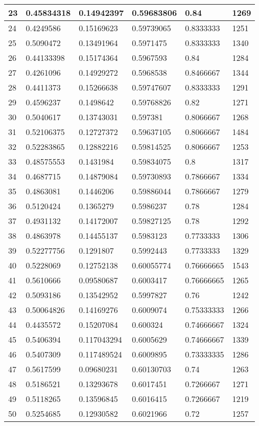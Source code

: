 \begin{longtable}{|l|l|l|l|l|l|}
23 & 0.45834318 & 0.14942397 & 0.59683806 & 0.84 & 1269 \\ \hline 
24 & 0.4249586 & 0.15169623 & 0.59739065 & 0.8333333 & 1251 \\ \hline 
25 & 0.5090472 & 0.13491964 & 0.5971475 & 0.8333333 & 1340 \\ \hline 
26 & 0.44133398 & 0.15174364 & 0.5967593 & 0.84 & 1284 \\ \hline 
27 & 0.4261096 & 0.14929272 & 0.5968538 & 0.8466667 & 1344 \\ \hline 
28 & 0.4411373 & 0.15266638 & 0.59747607 & 0.8333333 & 1291 \\ \hline 
29 & 0.4596237 & 0.1498642 & 0.59768826 & 0.82 & 1271 \\ \hline 
30 & 0.5040617 & 0.13743031 & 0.597381 & 0.8066667 & 1268 \\ \hline 
31 & 0.52106375 & 0.12727372 & 0.59637105 & 0.8066667 & 1484 \\ \hline 
32 & 0.52283865 & 0.12882216 & 0.59814525 & 0.8066667 & 1253 \\ \hline 
33 & 0.48575553 & 0.1431984 & 0.59834075 & 0.8 & 1317 \\ \hline 
34 & 0.4687715 & 0.14879084 & 0.59730893 & 0.7866667 & 1334 \\ \hline 
35 & 0.4863081 & 0.1446206 & 0.59886044 & 0.7866667 & 1279 \\ \hline 
36 & 0.5120424 & 0.1365279 & 0.5986237 & 0.78 & 1284 \\ \hline 
37 & 0.4931132 & 0.14172007 & 0.59827125 & 0.78 & 1292 \\ \hline 
38 & 0.4863978 & 0.14455137 & 0.5983123 & 0.7733333 & 1306 \\ \hline 
39 & 0.52277756 & 0.1291807 & 0.5992443 & 0.7733333 & 1329 \\ \hline 
40 & 0.5228069 & 0.12752138 & 0.60055774 & 0.76666665 & 1543 \\ \hline 
41 & 0.5610666 & 0.09580687 & 0.6003417 & 0.76666665 & 1265 \\ \hline 
42 & 0.5093186 & 0.13542952 & 0.5997827 & 0.76 & 1242 \\ \hline 
43 & 0.50064826 & 0.14169276 & 0.6009074 & 0.75333333 & 1266 \\ \hline 
44 & 0.4435572 & 0.15207084 & 0.600324 & 0.74666667 & 1324 \\ \hline 
45 & 0.5406394 & 0.117043294 & 0.6005629 & 0.74666667 & 1339 \\ \hline 
46 & 0.5407309 & 0.117489524 & 0.6009895 & 0.73333335 & 1286 \\ \hline 
47 & 0.5617599 & 0.09680231 & 0.60130703 & 0.74 & 1263 \\ \hline 
48 & 0.5186521 & 0.13293678 & 0.6017451 & 0.7266667 & 1271 \\ \hline 
49 & 0.5118265 & 0.13596845 & 0.6016415 & 0.7266667 & 1219 \\ \hline 
50 & 0.5254685 & 0.12930582 & 0.6021966 & 0.72 & 1257 \\ \hline 
\end{longtable}